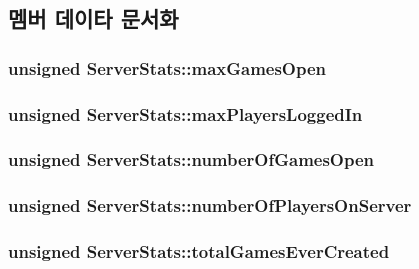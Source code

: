 \subsection{멤버 데이타 문서화}
\hypertarget{struct_server_stats_a25778c7b4a7ac21c22bcc67dda3ff54d}{
\subsubsection[{max\-Games\-Open}]{\setlength{\rightskip}{0pt plus 5cm}unsigned Server\-Stats\-::max\-Games\-Open}}\label{struct_server_stats_a25778c7b4a7ac21c22bcc67dda3ff54d}
\hypertarget{struct_server_stats_ab6da76ba04d76821233d4ed4bbf4a2ae}{
\subsubsection[{max\-Players\-Logged\-In}]{\setlength{\rightskip}{0pt plus 5cm}unsigned Server\-Stats\-::max\-Players\-Logged\-In}}\label{struct_server_stats_ab6da76ba04d76821233d4ed4bbf4a2ae}
\hypertarget{struct_server_stats_a6718463c122b2cf94a315fd796084838}{
\subsubsection[{number\-Of\-Games\-Open}]{\setlength{\rightskip}{0pt plus 5cm}unsigned Server\-Stats\-::number\-Of\-Games\-Open}}\label{struct_server_stats_a6718463c122b2cf94a315fd796084838}
\hypertarget{struct_server_stats_ae5c627e4a9c50bf2ff6c037ec0bc81d0}{
\subsubsection[{number\-Of\-Players\-On\-Server}]{\setlength{\rightskip}{0pt plus 5cm}unsigned Server\-Stats\-::number\-Of\-Players\-On\-Server}}\label{struct_server_stats_ae5c627e4a9c50bf2ff6c037ec0bc81d0}
\hypertarget{struct_server_stats_a66a158077e23174434110fb8fc26b9ff}{
\subsubsection[{total\-Games\-Ever\-Created}]{\setlength{\rightskip}{0pt plus 5cm}unsigned Server\-Stats\-::total\-Games\-Ever\-Created}}\label{struct_server_stats_a66a158077e23174434110fb8fc26b9ff}
